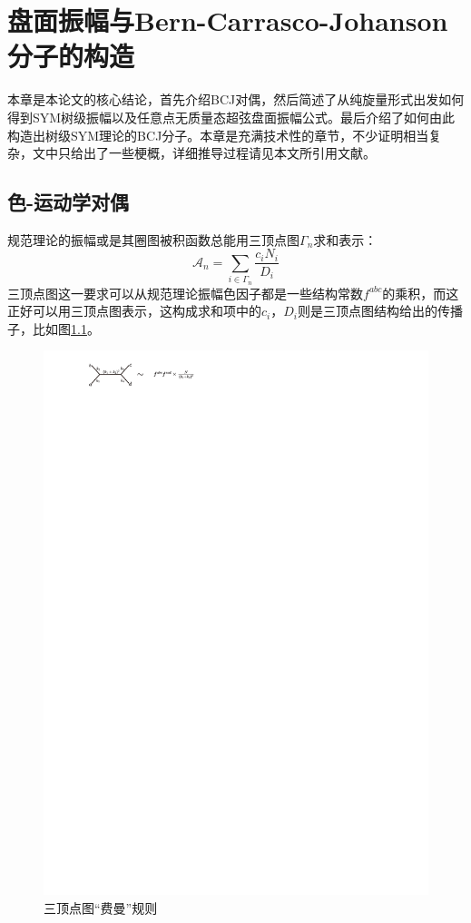 \chapter{盘面振幅与Bern-Carrasco-Johanson分子的构造}
\label{chap:6}
本章是本论文的核心结论，首先介绍BCJ对偶，然后简述了从纯旋量形式出发如何得到SYM树级振幅以及任意点无质量态超弦盘面振幅公式。最后介绍了如何由此构造出树级SYM理论的BCJ分子。本章是充满技术性的章节，不少证明相当复杂，文中只给出了一些梗概，详细推导过程请见本文所引用文献。
\section{色-运动学对偶}
规范理论的振幅或是其圈图被积函数总能用三顶点图$\Gamma_n$求和表示：
\begin{equation}
	\label{eq:6.1}
	\mathcal{A}_n=\sum_{i\in\Gamma_n}\frac{c_iN_i}{D_i}
\end{equation}
三顶点图这一要求可以从规范理论振幅色因子都是一些结构常数$f^{abc}$的乘积，而这正好可以用三顶点图表示，这构成求和项中的$c_i$，$D_i$则是三顶点图结构给出的传播子，比如图\ref{fig:6.1}。

\begin{figure}[htbp]
	\centering
	\includegraphics[width=0.8\linewidth]{figs/fig8.pdf}
	\caption{三顶点图“费曼”规则}
	\label{fig:6.1}
\end{figure}

